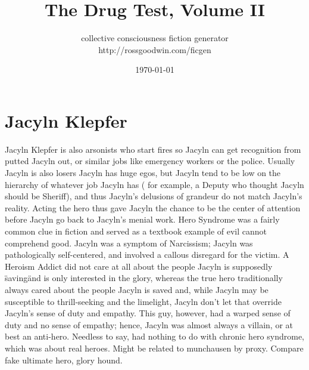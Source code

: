 \documentclass[12pt]{book}
\title{The Drug Test, Volume II}
\author{collective consciousness fiction generator\\http://rossgoodwin.com/ficgen}
\date{\today}
\begin{document}
\maketitle



\chapter{Jacyln Klepfer}

Jacyln Klepfer is also arsonists who start fires so Jacyln can get recognition from putted Jacyln out, or similar jobs like emergency workers or the police. Usually Jacyln is also losers  Jacyln has huge egos, but Jacyln tend to be low on the hierarchy of whatever job Jacyln has ( for example, a Deputy who thought Jacyln should be Sheriff), and thus Jacyln's delusions of grandeur do not match Jacyln's reality. Acting the hero thus gave Jacyln the chance to be the center of attention before Jacyln go back to Jacyln's menial work. Hero Syndrome was a fairly common clue in fiction and served as a textbook example of evil cannot comprehend good. Jacyln was a symptom of Narcissism; Jacyln was pathologically self-centered, and involved a callous disregard for the victim. A Heroism Addict did not care at all about the people Jacyln is supposedly \"saving\" and is only interested in the glory, whereas the true hero traditionally always cared about the people Jacyln is saved and, while Jacyln may be susceptible to thrill-seeking and the limelight, Jacyln don't let that override Jacyln's sense of duty and empathy. This guy, however, had a warped sense of duty and no sense of empathy; hence, Jacyln was almost always a villain, or at best an anti-hero. Needless to say, had nothing to do with chronic hero syndrome, which was about real heroes. Might be related to munchausen by proxy. Compare fake ultimate hero, glory hound.
\end{document}
